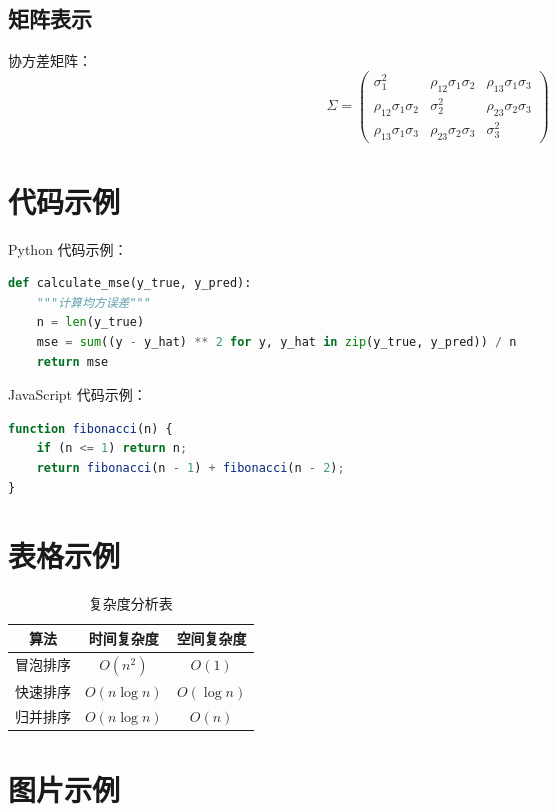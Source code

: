 \documentclass{article}
\begin{document}
\subsection{矩阵表示}
协方差矩阵：
\[
\Sigma = \begin{pmatrix}
\sigma_1^2 & \rho_{12}\sigma_1\sigma_2 & \rho_{13}\sigma_1\sigma_3 \\
\rho_{12}\sigma_1\sigma_2 & \sigma_2^2 & \rho_{23}\sigma_2\sigma_3 \\
\rho_{13}\sigma_1\sigma_3 & \rho_{23}\sigma_2\sigma_3 & \sigma_3^2
\end{pmatrix}
\]

\section{代码示例}
\label{sec:code}

Python 代码示例：
\begin{lstlisting}[language=Python]
def calculate_mse(y_true, y_pred):
    """计算均方误差"""
    n = len(y_true)
    mse = sum((y - y_hat) ** 2 for y, y_hat in zip(y_true, y_pred)) / n
    return mse
\end{lstlisting}

JavaScript 代码示例：
\begin{lstlisting}[language=JavaScript]
function fibonacci(n) {
    if (n <= 1) return n;
    return fibonacci(n - 1) + fibonacci(n - 2);
}
\end{lstlisting}

\section{表格示例}
\label{sec:table}

\begin{table}[htbp]
    \centering
    \caption{复杂度分析表}
    \begin{tabular}{|c|c|c|}
        \hline
        \textbf{算法} & \textbf{时间复杂度} & \textbf{空间复杂度} \\
        \hline
        冒泡排序 & $O(n^2)$ & $O(1)$ \\
        \hline
        快速排序 & $O(n \log n)$ & $O(\log n)$ \\
        \hline
        归并排序 & $O(n \log n)$ & $O(n)$ \\
        \hline
    \end{tabular}
\end{table}

\section{图片示例}
\label{sec:figure}
\end{document}
